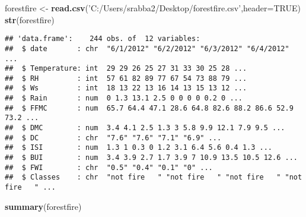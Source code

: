 \documentclass[
]{article}
\newenvironment{Shaded}{\begin{snugshade}}{\end{snugshade}}
\newcommand{\DataTypeTok}[1]{\textcolor[rgb]{0.13,0.29,0.53}{#1}}
\newcommand{\KeywordTok}[1]{\textcolor[rgb]{0.13,0.29,0.53}{\textbf{#1}}}
\newcommand{\NormalTok}[1]{#1}
\newcommand{\OtherTok}[1]{\textcolor[rgb]{0.56,0.35,0.01}{#1}}
\newcommand{\StringTok}[1]{\textcolor[rgb]{0.31,0.60,0.02}{#1}}
\begin{document}
\begin{Shaded}
\begin{Highlighting}[]
\NormalTok{forestfire <-}\StringTok{ }\KeywordTok{read.csv}\NormalTok{(}\StringTok{'C:/Users/srabba2/Desktop/forestfire.csv'}\NormalTok{,}\DataTypeTok{header=}\OtherTok{TRUE}\NormalTok{)}
\KeywordTok{str}\NormalTok{(forestfire)}
\end{Highlighting}
\end{Shaded}

\begin{verbatim}
## 'data.frame':    244 obs. of  12 variables:
##  $ date       : chr  "6/1/2012" "6/2/2012" "6/3/2012" "6/4/2012" ...
##  $ Temperature: int  29 29 26 25 27 31 33 30 25 28 ...
##  $ RH         : int  57 61 82 89 77 67 54 73 88 79 ...
##  $ Ws         : int  18 13 22 13 16 14 13 15 13 12 ...
##  $ Rain       : num  0 1.3 13.1 2.5 0 0 0 0 0.2 0 ...
##  $ FFMC       : num  65.7 64.4 47.1 28.6 64.8 82.6 88.2 86.6 52.9 73.2 ...
##  $ DMC        : num  3.4 4.1 2.5 1.3 3 5.8 9.9 12.1 7.9 9.5 ...
##  $ DC         : chr  "7.6" "7.6" "7.1" "6.9" ...
##  $ ISI        : num  1.3 1 0.3 0 1.2 3.1 6.4 5.6 0.4 1.3 ...
##  $ BUI        : num  3.4 3.9 2.7 1.7 3.9 7 10.9 13.5 10.5 12.6 ...
##  $ FWI        : chr  "0.5" "0.4" "0.1" "0" ...
##  $ Classes    : chr  "not fire   " "not fire   " "not fire   " "not fire   " ...
\end{verbatim}

\begin{Shaded}
\begin{Highlighting}[]
\KeywordTok{summary}\NormalTok{(forestfire)}
\end{Highlighting}
\end{Shaded}
\end{document}
